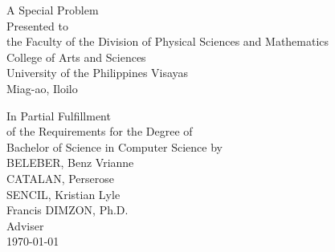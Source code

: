 \begin{titlepage}
\centering


\vspace{0.875cm}
A Special Problem\\
Presented to\\
the Faculty of the Division of Physical Sciences and Mathematics\\
College of Arts and Sciences\\
University of the Philippines Visayas\\
Miag-ao, Iloilo

\vspace{0.875cm}
In Partial Fulfillment\\
of the Requirements for the Degree of\\
Bachelor of Science in Computer Science
\vspace{1.75cm}
by\\

\vspace{0.1cm}
BELEBER, Benz Vrianne  \\
CATALAN, Perserose  \\
SENCIL, Kristian Lyle  \\

\vspace{0.875cm}
Francis DIMZON, Ph.D. \\
Adviser\\


\vspace{0.875cm}
\today
\end{titlepage}
